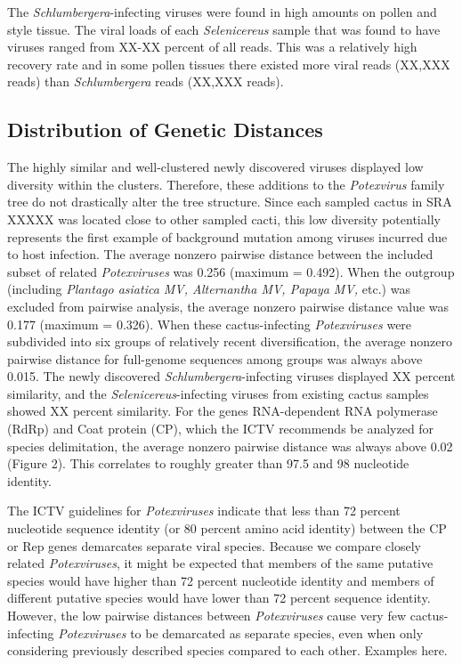 \documentclass[fleqn,10pt,lineno]{wlpeerj}
\begin{document}
The \textit{Schlumbergera}-infecting viruses were found in high amounts on pollen and style tissue.
The viral loads of each \textit{Selenicereus} sample that was found to have viruses ranged from XX-XX percent of all reads.
This was a relatively high recovery rate and in some pollen tissues there existed more viral reads (XX,XXX reads) than \textit{Schlumbergera} reads (XX,XXX reads).

\subsection*{Distribution of Genetic Distances}
The highly similar and well-clustered newly discovered viruses displayed low diversity within the clusters.
Therefore, these additions to the \textit{Potexvirus} family tree do not drastically alter the tree structure.
Since each sampled cactus in SRA XXXXX was located close to other sampled cacti, this low diversity potentially represents the first example of background mutation among viruses incurred due to host infection.
The average nonzero pairwise distance between the included subset of related \textit{Potexviruses} was 0.256 (maximum = 0.492). 
When the outgroup (including \textit{Plantago asiatica MV, Alternantha MV, Papaya MV,} etc.) was excluded from pairwise analysis, the average nonzero pairwise distance value was 0.177 (maximum = 0.326). 
When these cactus-infecting \textit{Potexviruses} were subdivided into six groups of relatively recent diversification, the average nonzero pairwise distance for full-genome sequences among groups was always above 0.015. 
The newly discovered \textit{Schlumbergera}-infecting viruses displayed XX percent similarity, and the \textit{Selenicereus}-infecting viruses from existing cactus samples showed XX percent similarity.
For the genes RNA-dependent RNA polymerase (RdRp) and Coat protein (CP), which the ICTV recommends be analyzed for species delimitation, the average nonzero pairwise distance was always above 0.02 (Figure 2). 
This correlates to roughly greater than 97.5 and 98 nucleotide identity. 


The ICTV guidelines for \textit{Potexviruses} indicate that less than 72 percent nucleotide sequence identity (or 80 percent amino acid identity) between the CP or Rep genes demarcates separate viral species. %
Because we compare closely related \textit{Potexviruses}, it might be expected that members of the same putative species would have higher than 72 percent nucleotide identity and members of different putative species would have lower than 72 percent sequence identity.
However, the low pairwise distances between \textit{Potexviruses} cause very few cactus-infecting \textit{Potexviruses} to be demarcated as separate species, even when only considering previously described species compared to each other.
Examples here.
\end{document}
